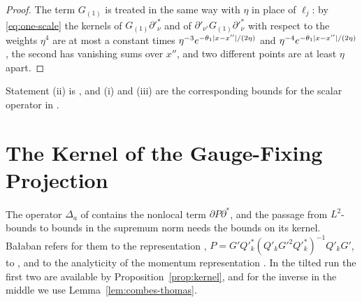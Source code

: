 \documentclass[11pt]{preprint}
\DeclarePairedDelimiter{\abs}{\lvert}{\rvert}
\numberwithin{equation}{section}
\theoremstyle{definition}
\theoremstyle{remark}
\theoremstyle{plain}
\begin{document}
\begin{proof}
The term $G_{(1)}$ is treated in the same way with $\eta$ in place of $\ell_j$: by \eqref{eq:one-scale} the kernels of $G_{(1)}\partial'^*_\nu$ and of $\partial'_{\nu'}G_{(1)}\partial'^*_\nu$ with respect to the weights $\eta^4$ are at most a constant times $\eta^{-3}e^{-\theta_1\abs{x - x''}/(2\eta)}$ and $\eta^{-4}e^{-\theta_1\abs{x - x''}/(2\eta)}$, the second has vanishing sums over $x''$, and two different points are at least $\eta$ apart.
\end{proof}

Statement (ii) is \cite[(1.137)]{BalabanPRT1}, and (i) and (iii) are the corresponding bounds for the scalar operator in \cite[(1.111), (1.113)]{BalabanPRT1}.

\section{The Kernel of the Gauge-Fixing Projection}\label{sec:projection-kernel}

The operator $\Delta_a$ of \cite[(1.69)]{BalabanPRT1} contains the nonlocal term $\partial P\partial^*$, and the passage from $L^2$-bounds to bounds in the supremum norm needs the bounds \cite[(1.126), (1.127)]{BalabanPRT1} on its kernel. Ba{\l}aban refers for them to the representation \cite[(1.44)]{BalabanPRT1}, $P = G'Q'^*_k(Q'_kG'^2Q'^*_k)^{-1}Q'_kG'$, to \cite[Lemma~2.4]{BalabanRDG}, and to the analyticity of the momentum representation \cite[(1.45)]{BalabanPRT1}. In the tilted run the first two are available by Proposition~\ref{prop:kernel}, and for the inverse in the middle we use Lemma~\ref{lem:combes-thomas}.
\end{document}
